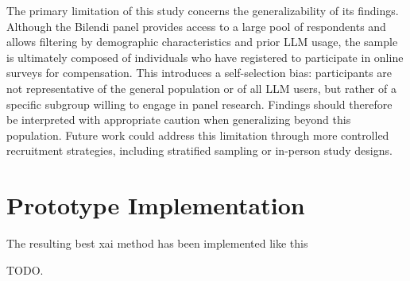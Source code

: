 The primary limitation of this study concerns the generalizability of its findings. Although the Bilendi panel provides access to a large pool of respondents and allows filtering by demographic characteristics and prior LLM usage, the sample is ultimately composed of individuals who have registered to participate in online surveys for compensation. This introduces a self-selection bias: participants are not representative of the general population or of all LLM users, but rather of a specific subgroup willing to engage in panel research. Findings should therefore be interpreted with appropriate caution when generalizing beyond this population. Future work could address this limitation through more controlled recruitment strategies, including stratified sampling or in-person study designs.

\section{Prototype Implementation}
The resulting best xai method has been implemented like this

TODO.